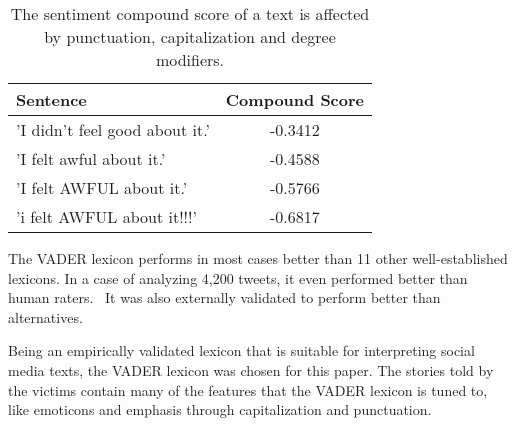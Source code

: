 \begin{table}
    \centering
    \begin{tabular}{lc}
        \hline
        \textbf{Sentence} & \textbf{Compound Score} \\ \hline
        'I didn't feel good about it.' & -0.3412  \\
        'I felt awful about it.' & -0.4588 \\ 
        'I felt AWFUL about it.' & -0.5766 \\ 
        'i felt AWFUL about it!!!' & -0.6817 \\ \hline
    \end{tabular}
    \caption{The sentiment compound score of a text is affected by punctuation, capitalization and degree modifiers.}
    \label{tab:sentiment_analysis_heuristics_effects}
\end{table}


The VADER lexicon performs in most cases better than 11 other well-established lexicons. In a case of analyzing 4,200 tweets, it even performed better than human raters.~\cite{hutto2014vader} It was also externally validated to perform better than alternatives.~\cite{al2020evaluating}\cite{min2020comparative}

Being an empirically validated lexicon that is suitable for interpreting social media texts, the VADER lexicon was chosen for this paper. The stories told by the victims contain many of the features that the VADER lexicon is tuned to, like emoticons and emphasis through capitalization and punctuation.

